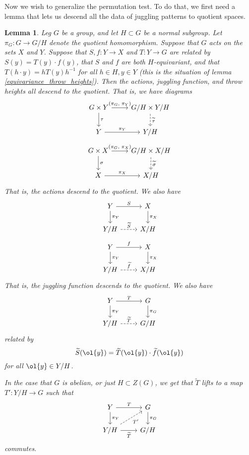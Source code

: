 \documentclass[12nt]{article}
\theoremstyle{plain}
\newtheorem{lemma}{Lemma}
\begin{document}
Now we wish to generalize the permutation test. To do that, we first need a lemma that lets us descend all the data of juggling patterns to quotient spaces. 
\begin{lemma}\label{throw_heights_descend}
Leg $G$ be a group, and let $H \subset G$ be a normal subgroup. Let $\pi_G : G \to G/H$ denote the quotient homomorphism. Suppose that $G$ acts on the sets $X$ and $Y$. Suppose that $S, f : Y \to X$ and $T : Y \to G$ are related by $S(y) = T(y) \cdot f(y)$, that $S$ and $f$ are both $H$-equivariant, and that $T(h \cdot y) = hT(y)h^{-1}$ for all $h \in H, y \in Y$ (this is the situation of lemma \ref{equivariance_throw_heights}). Then the actions, juggling function, and throw heights all descend to the quotient. That is, we have diagrams
\[
\begin{tikzcd}
G \times Y \ar[d, "\tau"] \ar[r, "(\pi_G \text{, } \pi_Y)"] & G/H \times Y/H \ar[d, dashed, "\widetilde{\tau}"] \\
Y \ar[r, "\pi_Y"] & Y/H
\end{tikzcd}
\]
\[
\begin{tikzcd}
G \times X \ar[d, "\sigma"] \ar[r, "(\pi_G \text{, } \pi_X)"] & G/H \times X/H \ar[d, dashed, "\widetilde{\sigma}"] \\
X \ar[r, "\pi_X"] & X/H
\end{tikzcd}
\]
That is, the actions descend to the quotient. We also have
\[
\begin{tikzcd}
Y \ar[d, "\pi_Y"] \ar[r, "S"] & X \ar[d, "\pi_X"] \\
Y/H \ar[r, dashed, "\widetilde{S}"] & X/H
\end{tikzcd}
\]
\[
\begin{tikzcd}
Y \ar[d, "\pi_Y"] \ar[r, "f"] & X \ar[d, "\pi_X"] \\
Y/H \ar[r, dashed, "\widetilde{f}"] & X/H
\end{tikzcd}
\]
That is, the juggling function descends to the quotient. We also have
\[
\begin{tikzcd}
Y  \ar[r, "T"] \ar[d, "\pi_Y"] & G \ar[d, "\pi_G"] \\
Y/H \ar[r, dashed, "\widetilde{T}"] & G/H
\end{tikzcd}
\]
related by 
\[
\widetilde{S}(\ol{y}) = \widetilde{T}(\ol{y}) \cdot \widetilde{f}(\ol{y})
\]
for all $\ol{y} \in Y/H$. 

In the case that $G$ is abelian, or just $H \subset Z(G)$, we get that $\widetilde{T}$ lifts to a map $T' : Y/H \to G$ such that 
\[
\begin{tikzcd}
Y  \ar[r, "T"] \ar[d, "\pi_Y"] & G \ar[d, "\pi_G"] \\
Y/H \ar[r, "\widetilde{T}"'] \ar[ur, dashed, "T'"'] & G/H
\end{tikzcd}
\]
commutes.
\end{lemma}
\end{document}
